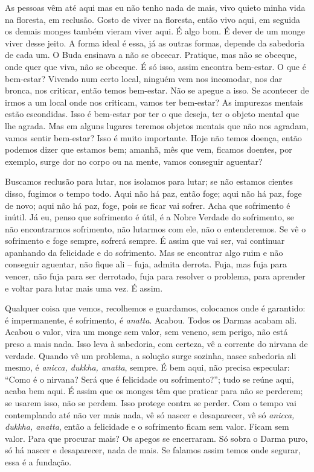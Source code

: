 As pessoas vêm até aqui mas eu não tenho nada de mais, vivo quieto
minha vida na floresta, em reclusão. Gosto de viver na floresta, então
vivo aqui, em seguida os demais monges também vieram viver aqui. É algo
bom. É dever de um monge viver desse jeito. A forma ideal é essa, já as
outras formas, depende da sabedoria de cada um. O Buda ensinava a não
se obcecar. Pratique, mas não se obceque, onde quer que viva, não se
obceque. É só isso, assim encontra bem-estar. O que é bem-estar?
Vivendo num certo local, ninguém vem nos incomodar, nos dar bronca, nos
criticar, então temos bem-estar. Não se apegue a isso. Se acontecer de
irmos a um local onde nos criticam, vamos ter bem-estar? As impurezas
mentais estão escondidas. Isso é bem-estar por ter o que deseja, ter o
objeto mental que lhe agrada. Mas em alguns lugares teremos objetos
mentais que não nos agradam, vamos sentir bem-estar? Isso é muito
importante. Hoje não temos doença, então podemos dizer que estamos bem;
amanhã, mês que vem, ficamos doentes, por exemplo, surge dor no corpo
ou na mente, vamos conseguir aguentar? 

Buscamos reclusão para lutar, nos isolamos para lutar; se não
estamos cientes disso, fugimos o tempo todo. Aqui não há paz, então
foge; aqui não há paz, foge de novo; aqui não há paz, foge, pois se
ficar vai sofrer. Acha que sofrimento é inútil. Já eu, penso que
sofrimento é útil, é a Nobre Verdade do sofrimento, se não encontrarmos
sofrimento, não lutarmos com ele, não o entenderemos. Se vê o
sofrimento e foge sempre, sofrerá sempre. É assim que vai ser, vai
continuar apanhando da felicidade e do sofrimento. Mas se encontrar
algo ruim e não conseguir aguentar, não fique ali – fuja, admita
derrota. Fuja, mas fuja para vencer, não fuja para ser derrotado, fuja
para resolver o problema, para aprender e voltar para lutar mais uma
vez. É assim. 

Qualquer coisa que vemos, recolhemos e guardamos, colocamos onde é
garantido: é impermanente, é sofrimento, é \emph{anatta}. Acabou.
Todos os Darmas acabam ali. Acabou o valor, vira um monge sem valor,
sem veneno, sem perigo, não está preso a mais nada. Isso leva à
sabedoria, com certeza, vê a corrente do nirvana de verdade. Quando vê
um problema, a solução surge sozinha, nasce sabedoria ali mesmo, é
\emph{anicca, dukkha, anatta}, sempre. É bem aqui, não precisa
especular: “Como é o nirvana? Será que é felicidade ou sofrimento?”;
tudo se reúne aqui, acaba bem aqui. É assim que os monges têm que
praticar para não se perderem; se usarem isso, não se perdem. Isso
protege contra se perder. Com o tempo vai contemplando até não ver mais
nada, vê só nascer e desaparecer, vê só \emph{anicca, dukkha,
anatta}, então a felicidade e o sofrimento ficam sem valor. Ficam sem
valor. Para que procurar mais? Os apegos se encerraram. Só sobra o
Darma puro, só há nascer e desaparecer, nada de mais. Se falamos assim
temos onde segurar, essa é a fundação.

